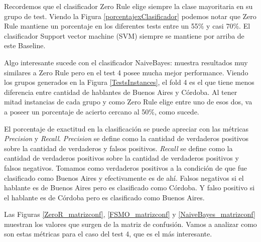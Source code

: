 Recordemos que el clasificador Zero Rule elige siempre la clase mayoritaria en su grupo de test. Viendo la Figura \ref{porcentajexClasificador} podemos notar que Zero Rule mantiene un porcentaje en los diferentes tests entre un 55\% y casi 70\%. El clasificador Support vector machine (SVM) siempre se mantiene por arriba de este Baseline.

Algo interesante sucede con el clasificador NaiveBayes: muestra resultados muy similares a Zero Rule pero en el test 4 posee mucha mejor performance. Viendo los grupos generados en la Figura \ref{TestsInstances}, el fold 4 es el que tiene menos diferencia entre cantidad de hablantes de Buenos Aires y Córdoba. Al tener mitad instancias de cada grupo y como Zero Rule elige entre uno de esos dos, va a poseer un porcentaje de acierto cercano al 50\%, como sucede.  

El porcentaje de exactitud en la clasificación se puede apreciar con las métricas \textit{Precision} y \textit{Recall}. \textit{Precision} se define como la cantidad de verdaderos positivos sobre la cantidad de verdaderos y falsos positivos. \textit{Recall} se define como la cantidad de verdaderos positivos sobre la cantidad de verdaderos positivos y falsos negativos. Tomamos como verdaderos positivos a la condición de que fue clasificado como Buenos Aires y efectivamente es de ahí. Falsos negativos si el hablante es de Buenos Aires pero es clasificado como Córdoba. Y falso positivo si el hablante es de Córdoba pero es clasificado como Buenos Aires. 


Las Figuras \ref{ZeroR_matrizconf}, \ref{FSMO_matrizconf} y \ref{NaiveBayes_matrizconf} muestran los valores que  surgen de la matriz de confusión. Vamos a analizar como son estas métricas para el caso del test 4, que es el más interesante.



